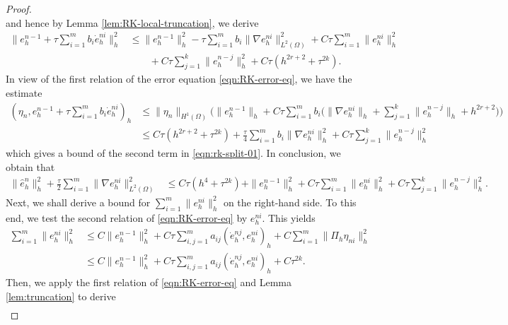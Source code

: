 \documentclass[a4paper, oneside]{book}
\def\II{(\Omega)}
\begin{document}
\begin{proof}
\begin{equation*}
\end{equation*}
and hence by Lemma \ref{lem:RK-local-truncation}, we derive
\begin{align*}
\|e_h^{n-1}+\tau\sum_{i=1}^{m} b_i\dot{e}_h^{ni}\|_h^2
&\leq \|e_h^{n-1}\|_h^2 - \tau\sum_{i=1}^{m}b_i \| \nabla e_h^{ni}  \|_{L^2\II}^2 + C\tau \sum_{i=1}^m  \|  e_h^{ni} \|_h^2 \\
&\qquad + C\tau \sum_{j=1}^k \| e_h^{n-j} \|_h^2 + C \tau(h^{2r+2}+\tau^{2k}).
\end{align*}
In view of the first relation of the error equation \eqref{eqn:RK-error-eq}, we have the estimate
\begin{align*}
(\eta_{n}, e_h^{n-1}+ \tau\sum_{i=1}^{m} b_i\dot{e}_h^{ni})_h
&\le \| \eta_n  \|_{H^1\II} \Big( \|e_h^{n-1}\|_h + C \tau  \sum_{i=1}^m b_i
\Big(\| \nabla e_h^{ni} \|_h + \sum_{j=1}^{k} \|  e_h^{n-j} \|_h  + h^{2r+2}\Big)\Big)\\
&\le C\tau(h^{2r+2}+ \tau^{2k})   + \frac{\tau}{4}   \sum_{i=1}^{m} b_i  \| \nabla e_h^{ni} \|_h^2
+ C\tau  \sum_{j=1}^{k} \|  e_h^{n-j} \|_h^2
\end{align*}
which gives a bound of the second term in \eqref{eqn:rk-split-01}. In conclusion, we obtain that
\begin{equation}\label{eqn:rk-est-02}
\begin{split}
 \|\hat e_h^{n}\|_h^2 + \frac\tau2 \sum_{i=1}^m \| \nabla e_h^{ni} \|_{L^2\II}^2& \le  C\tau(h^4+ \tau^{2k}) +  \|e_h^{n-1}\|_h^2
 + C \tau   \sum_{i=1}^m \|  e_h^{ni} \|_h^2 + C\tau  \sum_{j=1}^{k} \|  e_h^{n-j} \|_h^2.
\end{split}
\end{equation}
Next, we shall derive a bound for  $ \sum_{i=1}^m \|  e_h^{ni} \|_h^2 $
 on the right-hand side. To this
end, we test the second relation of  \eqref{eqn:RK-error-eq} by $e_h^{ni}$. This yields
\begin{equation*}
\begin{split}
 \sum_{i=1}^m \|e_h^{ni}\|_h^2 & \le C \|  e_h^{n-1} \|_h^2 + C\tau\sum_{i,j=1}^m a_{ij}(\dot e_h^{nj},e_h^{ni})_h + C\sum_{i=1}^m \| \Pi_h \eta_{ni} \|_h^2\\
& \le  C \|  e_h^{n-1} \|_h^2 + C\tau\sum_{i,j=1}^m a_{ij}(\dot e_h^{nj},e_h^{ni}) _h + C\tau^{2k}.
\end{split}
\end{equation*}
Then, we apply the first relation of  \eqref{eqn:RK-error-eq} and Lemma \ref{lem:truncation} to derive
\begin{equation*}
\begin{split}

\end{split}
\end{equation*}
\end{proof}
\end{document}

